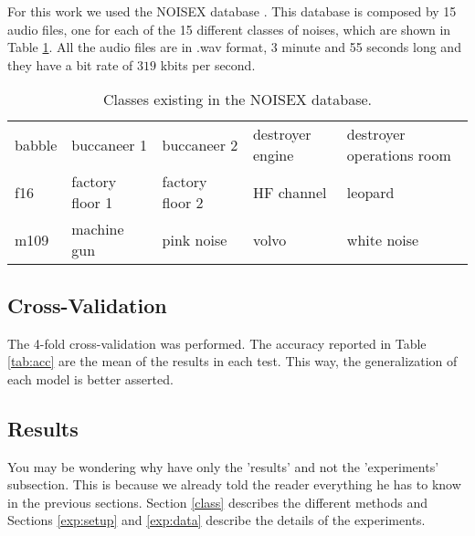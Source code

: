 \documentclass[12pt]{article}
\begin{document}

For this work we used the NOISEX database \cite{varga1993assessment}. This database is composed by 15 audio files, one for each of the 15 different classes of noises, which are shown in Table \ref{tab:noisex}. All the audio files are in .wav format, 3 minute and 55 seconds long and they have a bit rate of $319$ kbits per second.

\begin{table}[ht]
	\centering
	\caption{Classes existing in the NOISEX database.}
	\label{tab:noisex}
	\begin{tabular}{lllll}
		\hline
		babble & buccaneer 1 & buccaneer 2 & destroyer engine& destroyer operations room\\
		f16 & factory floor 1 & factory floor 2 & HF channel & leopard\\
		m109 & machine gun & pink noise & volvo & white noise\\
		\hline
	\end{tabular}
\end{table}

\subsection{Cross-Validation} \label{exp:crossv}

The 4-fold cross-validation was performed. The accuracy reported in Table \ref{tab:acc} are the mean of the results in each test. This way, the generalization of each model is better asserted.

\subsection{Results} \label{exp:res}

You may be wondering why have only the 'results' and not the 'experiments' subsection. This is because we already told the reader everything he has to know in the previous sections. Section \ref{class} describes the different methods and Sections \ref{exp:setup} and \ref{exp:data} describe the details of the experiments.
\end{document}
